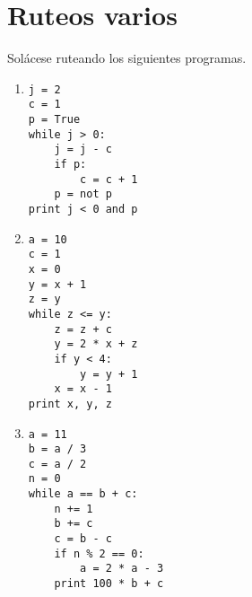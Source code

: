 \section{Ruteos varios}

Solácese ruteando los siguientes programas.

\begin{enumerate}
\item
\begin{lstlisting}
j = 2
c = 1
p = True
while j > 0:
    j = j - c
    if p:
        c = c + 1
    p = not p
print j < 0 and p
\end{lstlisting}

\item
\begin{lstlisting}
a = 10
c = 1
x = 0
y = x + 1
z = y
while z <= y:
    z = z + c
    y = 2 * x + z
    if y < 4:
        y = y + 1
    x = x - 1
print x, y, z
\end{lstlisting}

\item
\begin{lstlisting}
a = 11
b = a / 3
c = a / 2
n = 0
while a == b + c:
    n += 1
    b += c
    c = b - c
    if n % 2 == 0:
        a = 2 * a - 3
    print 100 * b + c
\end{lstlisting}

\end{enumerate}
